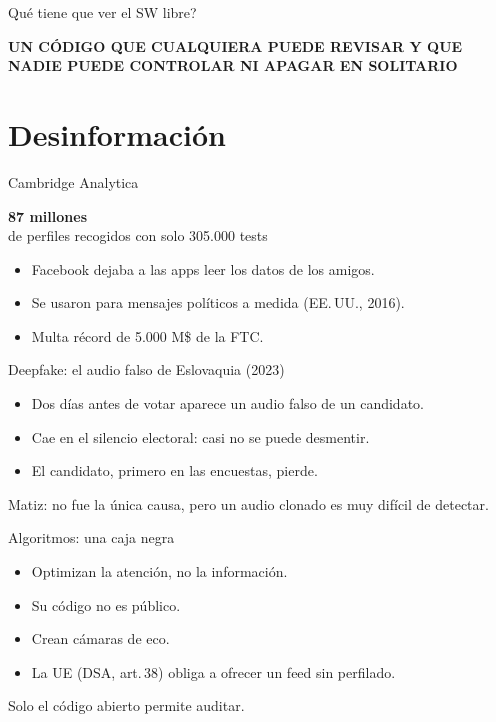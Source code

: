 \documentclass[aspectratio=169,12pt]{beamer}
\newcommand{\cifra}[2]{%
  \begin{center}
    {\color{terra}\fontsize{36}{40}\selectfont\bfseries #1}\\[0.2cm]
    {\large #2}
  \end{center}}
\begin{document}
\begin{frame}{Qué tiene que ver el SW libre?}
  \begin{itemize}
    \textbf{UN CÓDIGO QUE CUALQUIERA PUEDE REVISAR Y QUE NADIE PUEDE CONTROLAR NI APAGAR EN SOLITARIO}
  \end{itemize}
  \vspace{0.5cm}
\end{frame}

\section{Desinformación}
\begin{frame}{Cambridge Analytica}
  \cifra{87 millones}{de perfiles recogidos con solo 305.000 tests}
  \begin{itemize}
    \item Facebook dejaba a las apps leer los datos de los amigos.
    \item Se usaron para mensajes políticos a medida (EE.\,UU., 2016).
    \item Multa récord de 5.000 M\$ de la FTC.
  \end{itemize}
\end{frame}

\begin{frame}{Deepfake: el audio falso de Eslovaquia (2023)}
  \begin{itemize}
    \item Dos días antes de votar aparece un audio falso de un candidato.
    \item Cae en el silencio electoral: casi no se puede desmentir.
    \item El candidato, primero en las encuestas, pierde.
  \end{itemize}
  \vspace{0.5cm}
  {\large\alert{Matiz:} no fue la única causa, pero un audio clonado es muy difícil de detectar.}
\end{frame}

\begin{frame}{Algoritmos: una caja negra}
  \begin{itemize}
    \item Optimizan la atención, no la información.
    \item Su código no es público.
    \item Crean cámaras de eco.
    \item La UE (DSA, art.\,38) obliga a ofrecer un feed sin perfilado.
  \end{itemize}
  \vspace{0.5cm}
  {\large\alert{Solo el código abierto permite auditar.}}
\end{frame}
\end{document}
